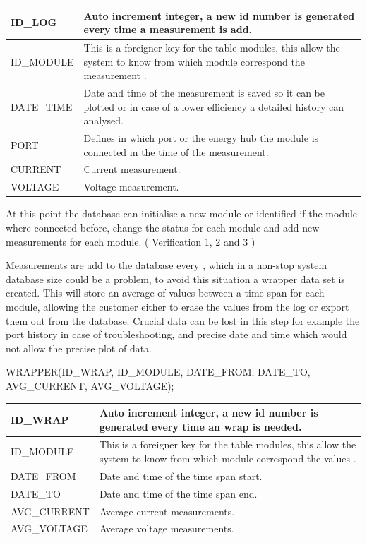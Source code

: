 \begin{table}[H]
\centering
	\begin{tabular}{| p{2cm} | p{10cm} |}
		\hline
		ID\_LOG & Auto increment integer, a new id number is generated every time a measurement is add. \\\hline
		ID\_MODULE & This is a foreigner key for the table modules, this allow the system to know from which module correspond the measurement .\\\hline
		DATE\_TIME & Date and time of the measurement is saved so it can be plotted or in case of a lower efficiency a detailed history can analysed. \\\hline
		PORT & Defines in which port or the energy hub the module is connected in the time of the measurement. \\\hline
		CURRENT & Current measurement. \\\hline
		VOLTAGE & Voltage measurement. \\\hline
	\end{tabular}
\end{table}

At this point the database can initialise a new module or identified if the module where connected before, change the status for each module and add new measurements for each module. ( Verification 1, 2 and 3 )

Measurements are add to the database every , which in a non-stop system database size could be a problem, to avoid this situation a wrapper data set is created. This will store an average of values between a time span for each module, allowing the customer either to erase the values from the log or export them out from the database. Crucial data can be lost in this step for example the port history in case of troubleshooting, and precise date and time which would not allow the precise plot of data. 

WRAPPER(ID\_WRAP, ID\_MODULE, DATE\_FROM, DATE\_TO, AVG\_CURRENT, AVG\_VOLTAGE);

\begin{table}[H]
\centering
	\begin{tabular}{| l | p{10cm} |}
		\hline
		ID\_WRAP & Auto increment integer, a new id number is generated every time an wrap is needed. \\\hline
		ID\_MODULE & This is a foreigner key for the table modules, this allow the system to know from which module correspond the values .\\\hline
		DATE\_FROM & Date and time of the time span start. \\\hline
		DATE\_TO & Date and time of the time span end. \\\hline
		AVG\_CURRENT & Average current measurements. \\\hline
		AVG\_VOLTAGE & Average voltage measurements. \\\hline
	\end{tabular}
\end{table}

